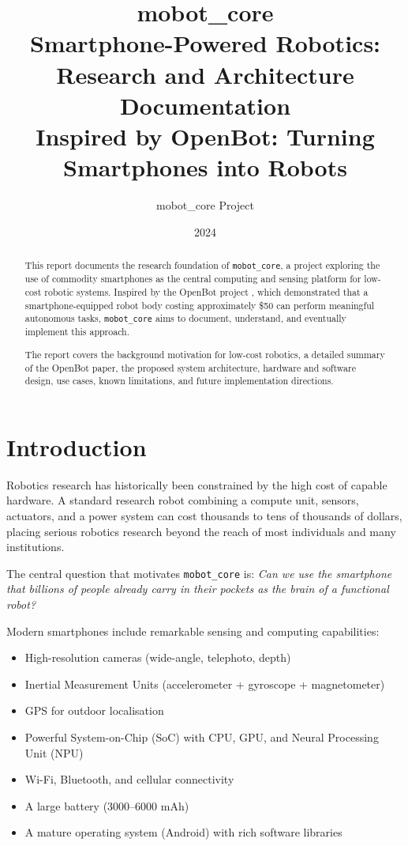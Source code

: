 \documentclass[12pt,a4paper]{article}
\title{
    \vspace{2cm}
    \textbf{\Large mobot\_core} \\[0.5em]
    \large Smartphone-Powered Robotics: \\
    Research and Architecture Documentation \\[1em]
    \normalsize Inspired by OpenBot: Turning Smartphones into Robots \\
    \small \citep{openbot2021}
}
\author{mobot\_core Project}
\date{2024}
\begin{document}
\maketitle
\thispagestyle{empty}

\vfill
\begin{abstract}
    This report documents the research foundation of \texttt{mobot\_core}, a project exploring
    the use of commodity smartphones as the central computing and sensing platform for
    low-cost robotic systems. Inspired by the OpenBot project \citep{openbot2021}, which
    demonstrated that a smartphone-equipped robot body costing approximately \$50 can perform
    meaningful autonomous tasks, \texttt{mobot\_core} aims to document, understand, and
    eventually implement this approach.

    The report covers the background motivation for low-cost robotics, a detailed summary
    of the OpenBot paper, the proposed system architecture, hardware and software design,
    use cases, known limitations, and future implementation directions.
\end{abstract}
\vfill

\newpage
\tableofcontents
\newpage

\section{Introduction}
\label{sec:introduction}

Robotics research has historically been constrained by the high cost of capable hardware.
A standard research robot combining a compute unit, sensors, actuators, and a power system
can cost thousands to tens of thousands of dollars, placing serious robotics research beyond
the reach of most individuals and many institutions.

The central question that motivates \texttt{mobot\_core} is: \emph{Can we use the smartphone
that billions of people already carry in their pockets as the brain of a functional robot?}

Modern smartphones include remarkable sensing and computing capabilities:
\begin{itemize}
    \item High-resolution cameras (wide-angle, telephoto, depth)
    \item Inertial Measurement Units (accelerometer + gyroscope + magnetometer)
    \item GPS for outdoor localisation
    \item Powerful System-on-Chip (SoC) with CPU, GPU, and Neural Processing Unit (NPU)
    \item Wi-Fi, Bluetooth, and cellular connectivity
    \item A large battery (3000--6000 mAh)
    \item A mature operating system (Android) with rich software libraries
\end{itemize}
\end{document}
